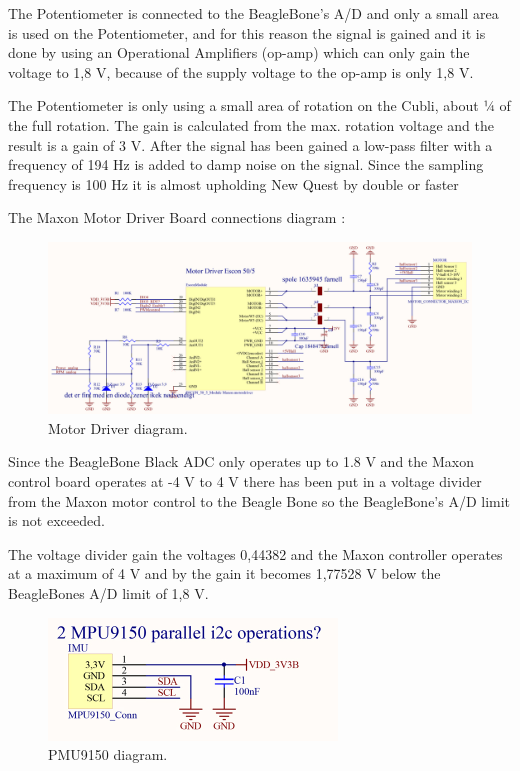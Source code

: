 The Potentiometer is connected to the BeagleBone’s A/D and only a small area is used on the Potentiometer, and for this reason the signal is gained and it is done by using an Operational Amplifiers (op-amp) which can only gain the voltage to 1,8 V, because of the supply voltage to the op-amp is only 1,8 V.

The Potentiometer is only using a small area of rotation on the Cubli, about ¼ of the full rotation. The gain is calculated from the max. rotation voltage and the result is a gain of 3 V. After the signal has been gained a low-pass filter with a frequency of 194 Hz is added to damp noise on the signal. Since the sampling frequency is 100 Hz it is almost upholding New Quest by double or faster

The Maxon Motor Driver Board connections diagram :\\

\begin{figure}[H]
	\centering
	\includegraphics[scale=0.92]{figures/MotorDriver.pdf}
	\caption{Motor Driver diagram.}
	\label{labMotorDriver}
\end{figure}\vspace{-5mm}

Since the BeagleBone Black ADC only operates up to 1.8 V and the Maxon control board operates at -4 V to 4 V there has been put in a voltage divider from the Maxon motor control to the Beagle Bone so the BeagleBone’s A/D limit is not exceeded.

The voltage divider gain the voltages 0,44382 and the Maxon controller operates at a maximum of 4 V and by the gain it becomes 1,77528 V below the BeagleBones A/D limit of 1,8 V.



\begin{figure}[H]
	\centering
	\includegraphics[scale=0.92]{figures/PMU9150.pdf}
	\caption{PMU9150 diagram.}
	\label{labPMU9150}
\end{figure}\vspace{-5mm}


